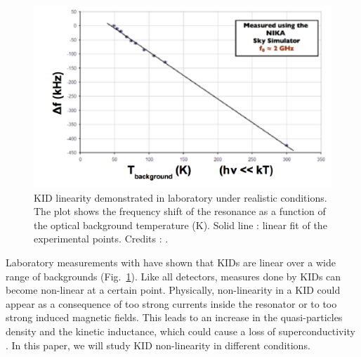 \begin{figure}
\center
\includegraphics[clip, angle=0, width=\columnwidth]{Figures/KID-linearity-Monfardini2014.png}
\caption{KID linearity demonstrated in laboratory under realistic
  conditions. The plot shows the frequency shift of the resonance as a function
  of the optical background temperature (K). Solid line : linear fit of the
  experimental points. Credits : \citet{2014JLTP..176..787M}.}
\label{fig:KID-lin}
\end{figure}

Laboratory measurements with  have shown that
KIDs are linear over a wide range of backgrounds (Fig.~\ref{fig:KID-lin}). Like all detectors, measures done by KIDs can become non-linear at a certain point. Physically, non-linearity in a KID could appear as a consequence of too strong currents inside the resonator or to too strong induced magnetic fields. This leads to an increase in the quasi-particles density and the kinetic inductance, which could cause a loss of superconductivity \citep{Calvo2008} . In this paper, we will study KID non-linearity in different conditions. 

%
%

